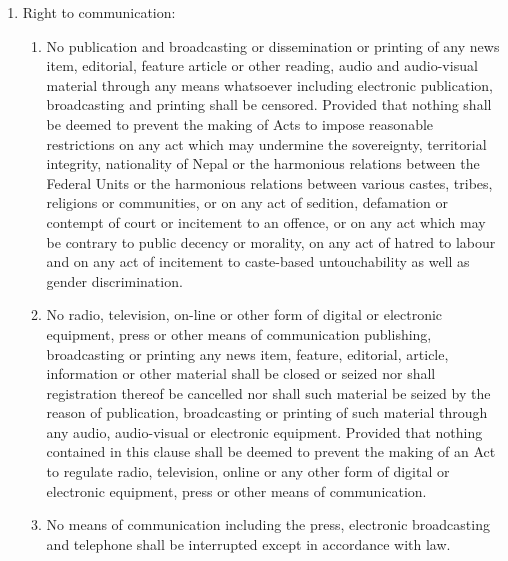 \begin{questions}
\begin{solution}
\begin{enumerate}
\item Right to communication:
\begin{enumerate}
    \item No publication and broadcasting or dissemination or printing of any news item, editorial, feature article or other reading, audio and audio-visual material through any means whatsoever including electronic publication, broadcasting and printing shall be censored. Provided that nothing shall be deemed to prevent the making of Acts to impose reasonable restrictions on any act which may undermine the sovereignty, territorial integrity, nationality of Nepal or the harmonious relations between the Federal Units or the harmonious relations between various castes, tribes, religions or communities, or on any act of sedition, defamation or contempt of court or incitement to an offence, or on any act which may be contrary to public decency or morality, on any act of hatred to labour and on any act of incitement to caste-based untouchability as well as gender discrimination.
    \item No radio, television, on-line or other form of digital or electronic equipment, press or other means of communication publishing, broadcasting or printing any news item, feature, editorial, article, information or other material shall be closed or seized nor shall registration thereof be cancelled nor shall such material be seized by the reason of publication, broadcasting or printing of such material through any audio, audio-visual or electronic equipment. Provided that nothing contained in this clause shall be deemed to prevent the making of an Act to regulate radio, television, online or any other form of digital or electronic equipment, press or other means of communication.
    \item No means of communication including the press, electronic broadcasting and telephone shall be interrupted except in accordance with law.
\end{enumerate}


\end{enumerate}
\end{solution}
\end{questions}
